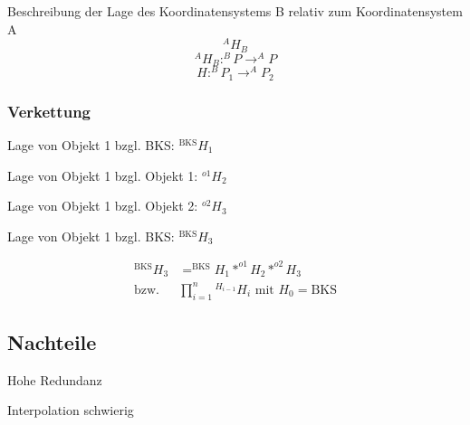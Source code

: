 Beschreibung der Lage des Koordinatensystems B relativ zum Koordinatensystem A
\begin{displaymath}
    ^AH_B
\end{displaymath}
\begin{displaymath}
    ^AH_B: ^BP \rightarrow ^AP
\end{displaymath}
\begin{displaymath}
    H: ^BP_1 \rightarrow ^AP_2
\end{displaymath}
\subsubsection{Verkettung}

\begin{compactitem}
    \item Lage von Objekt 1 bzgl. BKS: $^\text{BKS}H_1$
    \item Lage von Objekt 1 bzgl. Objekt 1: $^{o1}H_2$
    \item Lage von Objekt 1 bzgl. Objekt 2: $^{o2}H_3$
    \item Lage von Objekt 1 bzgl. BKS: $^\text{BKS}H_3$
\end{compactitem}

\begin{align}
     ^\text{BKS}H_3 &= ^\text{BKS}H_1 * ^{o1}H_2 * ^{o2}H_3 \\
     \text{bzw.} &\prod^n_{i=1}{}^{H_{i-1}}H_i \text{ mit } H_0 = \text{BKS}
\end{align}

\subsection{Nachteile}
\begin{compactitem}
    \item Hohe Redundanz
    \item Interpolation schwierig
\end{compactitem}

